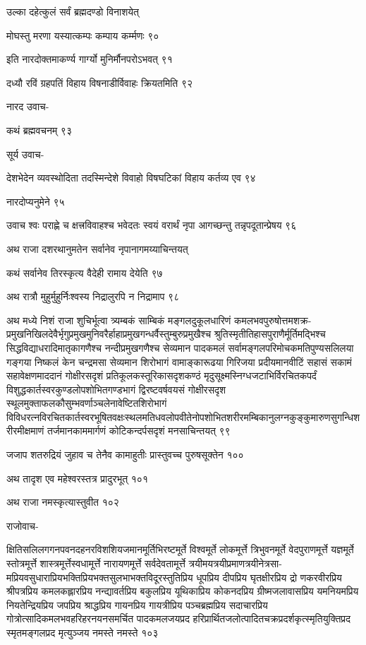 उल्का दहेत्कुलं सर्वं ब्रह्मदण्डो विनाशयेत्

मोघस्तु मरणा यस्यात्कम्पः कम्पाय कर्म्मणः ९०

इति नारदोक्तमाकर्ण्य गार्ग्यो मुनिर्मौनपरोऽभवत् ९१

दध्यौ रविं ग्रहपतिं विहाय विषनाडीर्विवाहः क्रियतमिति ९२

नारद उवाच-

कथं ब्रह्मवचनम् ९३

सूर्य उवाच-

देशभेदेन व्यवस्थोदिता तदस्मिन्देशे विवाहो विषघटिकां विहाय कर्तव्य एव ९४

नारदोप्यनुमेने ९५

उवाच श्वः पराह्णे च क्षत्त्रविवाहश्च भवेदतः स्वयं वरार्थं नृपा आगच्छन्तु तन्नृपदूतान्प्रेषय ९६

अथ राजा दशरथानुमतेन सर्वानेव नृपानागमय्याचिन्तयत्

कथं सर्वानेव तिरस्कृत्य वैदेही रामाय देयेति ९७

अथ रात्रौ मुहुर्मुहुर्निःश्वस्य निद्रालुरपि न निद्रामाप ९८

अथ मध्ये निशं राजा शुचिर्भूत्वा त्र्यम्बकं साम्बिकं मङ्गलदुकूलधारिणं
कमलभवपुरुषोत्तमशक्र-प्रमुखनिखिलदेवैर्भृगुप्रमुखमुनिवरैर्हाहाप्रमुखगन्धर्वैस्तुम्बुरुप्रमुखैश्च
श्रुतिस्मृतीतिहासपुराणैर्मूर्तिमद्भिश्च सिद्धविद्याधरादिमातृकागणैश्च नन्दीप्रमुखगणैश्च सेव्यमान
पादकमलं सर्वामङ्गलपरिमोचकमतिपुण्यसलिलया गङ्गया निष्कलं केन चन्द्रमसा सेव्यमान शिरोभागं
वामाङ्कारूढया गिरिजया प्रदीयमानवीटिं सहासं सकामं सहावेक्षणमाददानं गोक्षीरसदृशं
प्रतिकूलकस्तूरिकासदृशकण्ठं मृदुसूक्ष्मस्निग्धजटाभिर्विरचितकपर्दं
विशुद्धकार्तस्वरकुण्डलोपशोभितगण्डभागं द्विरष्टवर्षवयसं गोक्षीरसदृश
स्थूलमुक्ताफलकौसुम्भवर्णाञ्चलेनावेष्टितशिरोभागं
विविधरत्नविरचितकार्तस्वरभूषितवक्षःस्थलमतिधवलोपवीतेनोपशोभितशरीरमम्बिकानुलग्नकुङ्कुमारुणसुगन्धिशरीरमीक्षमाणं
तर्जमानकाममार्गणं कोटिकन्दर्पसदृशं मनसाचिन्तयत् ९९

जजाप शतरुद्रियं जुहाव च तेनैव कामाहुतीः प्रास्तुवच्च पुरुषसूक्तेन १००

अथ तादृश एव महेश्वरस्तत्र प्रादुरभूत् १०१

अथ राजा नमस्कृत्यास्तुवीत १०२

राजोवाच-

क्षितिसलिलगगनपवनदहनरविशशियजमानमूर्तिभिरष्टमूर्ते विश्वमूर्ते लोकमूर्त्ते त्रिभुवनमूर्ते
वेदपुराणमूर्त्ते यज्ञमूर्ते स्तोत्रमूर्त्ते शास्त्रमूर्त्तेस्वधामूर्त्ते नारायणमूर्त्ते सर्वदेवतामूर्त्ते
त्रयीमयत्रयीप्रमाणत्रयीनेत्रसा-मप्रियवसुधाराप्रियभक्तिप्रियभक्तसुलभाभक्तविदूरस्तुतिप्रिय
धूपप्रिय दीपप्रिय घृतक्षीरप्रिय द्रो णकरवीरप्रिय श्रीपत्रप्रिय कमलकह्लारप्रिय
नन्द्यावर्तप्रिय बकुलप्रिय यूथिकाप्रिय कोकनदप्रिय ग्रीष्मजलावासप्रिय यमनियमप्रिय
नियतेन्द्रियप्रिय जपप्रिय श्राद्धप्रिय गायनप्रिय गायत्रीप्रिय पञ्चब्रह्मप्रिय सदाचारप्रिय
गोत्रोत्सादिकमलभवहरिहरनयनसमर्चित पादकमलजयप्रद
हरिप्रार्थितजलोत्पादितचक्रप्रदर्शकृत्स्मृतियुक्तिप्रद स्मृतमङ्गलप्रद मृत्युञ्जय नमस्ते नमस्ते १०३

